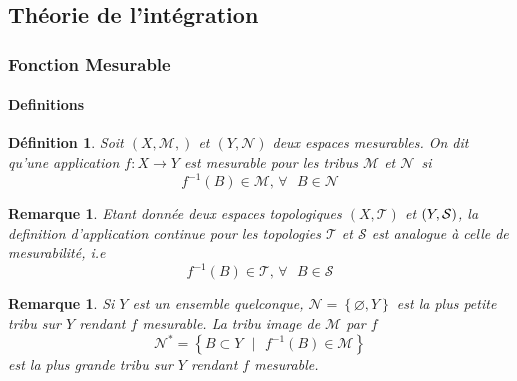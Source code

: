 \documentclass[3pt]{article}
\newtheorem{definition}[theorem]{D\'{e}finition}
\newtheorem{remark}[theorem]{Remarque}
\begin{document}
\subsection{Th\'{e}orie de l'int\'{e}gration}

\bigskip

\subsubsection{Fonction Mesurable}

\bigskip

\paragraph{Definitions}

\bigskip

\begin{definition}
Soit $(X,\mathcal{M},)$ et $(Y,\mathcal{N})$ deux espaces mesurables. On dit
qu'une application $f:X\rightarrow Y$ est mesurable pour les tribus $%
\mathcal{M}$ et $\mathcal{N}$\ si 
\begin{equation*}
f^{-1}(B)\in \mathcal{M}\text{, }\forall \text{ }B\in \mathcal{N}
\end{equation*}
\end{definition}

\bigskip

\begin{remark}
Etant donn\'{e}e deux espaces topologiques $(X,\mathcal{T})$ et $(Y,\mathcal{%
S})$, la definition d'application continue pour les topologies $\mathcal{T}$
et $\mathcal{S}$ est analogue \`{a} celle de mesurabilit\'{e}, i.e%
\begin{equation*}
f^{-1}(B)\in \mathcal{T}\text{, }\forall \text{ }B\in \mathcal{S}
\end{equation*}
\end{remark}

\bigskip

\begin{remark}
Si $Y$ est un ensemble quelconque, $\mathcal{N=}\left\{ \varnothing
,Y\right\} $ est la plus petite tribu sur $Y$ rendant $f$ mesurable. La
tribu image de $\mathcal{M}$ par $f\ $%
\begin{equation*}
\mathcal{N}^{\ast }\mathcal{=}\left\{ B\subset Y\text{ }|\text{ }%
f^{-1}(B)\in \mathcal{M}\right\}
\end{equation*}%
est la plus grande tribu sur $Y$ rendant $f$ mesurable.
\end{remark}
\end{document}
